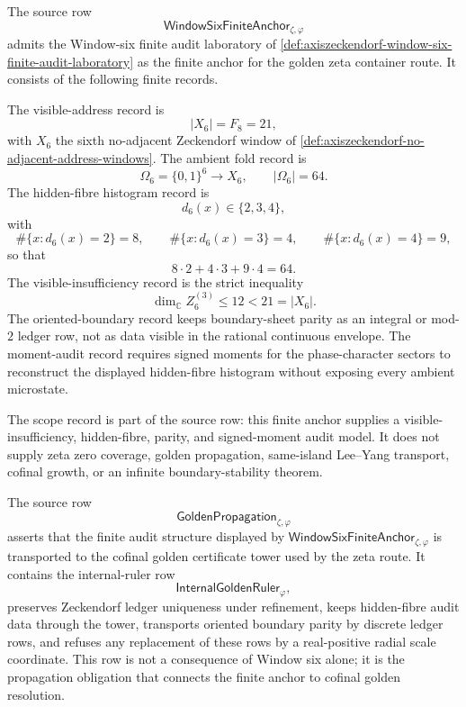 \begin{definition}
\label{def:rh-window-six-finite-audit-anchor}
The source row
$$
\mathsf{WindowSixFiniteAnchor}_{\zeta,\varphi}
$$
admits the Window-six finite audit laboratory of
\autoref{def:axiszeckendorf-window-six-finite-audit-laboratory} as the
finite anchor for the golden zeta container route.  It consists of the
following finite records.

The visible-address record is
$$
|X_6|=F_8=21,
$$
with $X_6$ the sixth no-adjacent Zeckendorf window of
\autoref{def:axiszeckendorf-no-adjacent-address-windows}.  The ambient
fold record is
$$
\Omega_6=\{0,1\}^6
\longrightarrow
X_6,
\qquad
|\Omega_6|=64.
$$
The hidden-fibre histogram record is
$$
d_6(x)\in\{2,3,4\},
$$
with
$$
\#\{x:d_6(x)=2\}=8,
\qquad
\#\{x:d_6(x)=3\}=4,
\qquad
\#\{x:d_6(x)=4\}=9,
$$
so that
$$
8\cdot2+4\cdot3+9\cdot4=64.
$$
The visible-insufficiency record is the strict inequality
$$
\dim_{\mathbb C} Z_6^{(3)}
\leq
12
<
21
=
|X_6|.
$$
The oriented-boundary record keeps boundary-sheet parity as an integral
or mod-$2$ ledger row, not as data visible in the rational continuous
envelope.  The moment-audit record requires signed moments for the
phase-character sectors to reconstruct the displayed hidden-fibre
histogram without exposing every ambient microstate.

The scope record is part of the source row: this finite anchor supplies
a visible-insufficiency, hidden-fibre, parity, and signed-moment audit
model.  It does not supply zeta zero coverage, golden propagation,
same-island Lee--Yang transport, cofinal growth, or an infinite
boundary-stability theorem.
\end{definition}

\begin{definition}
\label{def:rh-golden-propagation-source-row}
The source row
$$
\mathsf{GoldenPropagation}_{\zeta,\varphi}
$$
asserts that the finite audit structure displayed by
$\mathsf{WindowSixFiniteAnchor}_{\zeta,\varphi}$ is transported to the
cofinal golden certificate tower used by the zeta route.  It contains
the internal-ruler row
$$
\mathsf{InternalGoldenRuler}_{\varphi},
$$
preserves Zeckendorf ledger uniqueness under refinement, keeps
hidden-fibre audit data through the tower, transports oriented boundary
parity by discrete ledger rows, and refuses any replacement of these
rows by a real-positive radial scale coordinate.  This row is not a
consequence of Window six alone; it is the propagation obligation that
connects the finite anchor to cofinal golden resolution.
\end{definition}

